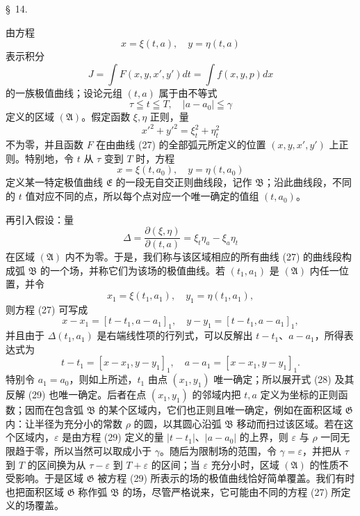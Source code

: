 \documentclass[11pt,a4paper,leqno]{article}
\begin{document}
\begin{center}{\large \S~14.}\end{center}

由方程
\begin{equation}\tag{27}
x=\xi(t,a),\quad y=\eta(t,a)
\end{equation}
表示积分
\[
J=\int F(x,y,x',y')dt=\int f(x,y,p)dx
\]
的一族极值曲线；设论元组 $(t,a)$ 属于由不等式
\[
\tau\leqq t\leqq T,\quad |a-a_0|\leqq \gamma
\]
定义的区域 $(\mathfrak{A})$。假定函数 $\xi,\eta$ 正则，量
\[
x'^2+y'^2=\xi_t^2+\eta_t^2
\]
不为零，并且函数 $F$ 在由曲线 (27) 的全部弧元所定义的位置 $(x,y,x',y')$ 上正则。特别地，令 $t$ 从 $\tau$ 变到 $T$ 时，方程
\[
x=\xi(t,a_0),\quad y=\eta(t,a_0)
\]
定义某一特定极值曲线 $\mathfrak{E}$ 的一段无自交正则曲线段，记作 $\mathfrak{B}$；沿此曲线段，不同的 $t$ 值对应不同的点，所以每个点对应一个唯一确定的值组 $(t,a_0)$。

再引入假设：量
\[
\Delta=\frac{\partial(\xi,\eta)}{\partial(t,a)}=\xi_t\eta_a-\xi_a\eta_t
\]
在区域 $(\mathfrak{A})$ 内不为零。于是，我们称与该区域相应的所有曲线 (27) 的曲线段构成弧 $\mathfrak{B}$ 的一个场，并称它们为该场的极值曲线。若 $(t_1,a_1)$ 是 $(\mathfrak{A})$ 内任一位置，并令
\[
x_1=\xi(t_1,a_1),\quad y_1=\eta(t_1,a_1),
\]
则方程 (27) 可写成
\begin{equation}\tag{28}
x-x_1=[t-t_1,a-a_1]_1,
\quad y-y_1=[t-t_1,a-a_1]_1,
\end{equation}
并且由于 $\Delta(t_1,a_1)$ 是右端线性项的行列式，可以反解出 $t-t_1$、$a-a_1$，所得表达式为
\begin{equation}\tag{29}
t-t_1=[x-x_1,y-y_1]_1,
\quad a-a_1=[x-x_1,y-y_1]_1.
\end{equation}
特别令 $a_1=a_0$，则如上所述，$t_1$ 由点 $(x_1,y_1)$ 唯一确定；所以展开式 (28) 及其反解 (29) 也唯一确定。后者在点 $(x_1,y_1)$ 的邻域内把 $t,a$ 定义为坐标的正则函数；因而在包含弧 $\mathfrak{B}$ 的某个区域内，它们也正则且唯一确定，例如在面积区域 $\mathfrak{G}$ 内：让半径为充分小的常数 $\rho$ 的圆，以其圆心沿弧 $\mathfrak{B}$ 移动而扫过该区域。若在这个区域内，$\varepsilon$ 是由方程 (29) 定义的量 $|t-t_1|$、$|a-a_0|$ 的上界，则 $\varepsilon$ 与 $\rho$ 一同无限趋于零，所以当然可以取成小于 $\gamma$。随后为限制场的范围，令 $\gamma=\varepsilon$，并把从 $\tau$ 到 $T$ 的区间换为从 $\tau-\varepsilon$ 到 $T+\varepsilon$ 的区间；当 $\varepsilon$ 充分小时，区域 $(\mathfrak{A})$ 的性质不受影响。于是区域 $\mathfrak{G}$ 被方程 (29) 所表示的场的极值曲线恰好简单覆盖。我们有时也把面积区域 $\mathfrak{G}$ 称作弧 $\mathfrak{B}$ 的场，尽管严格说来，它可能由不同的方程 (27) 所定义的场覆盖。
\end{document}
